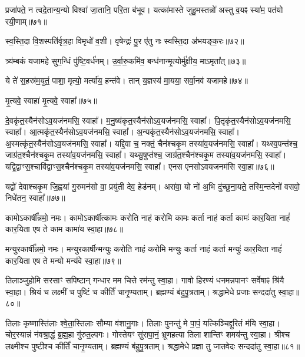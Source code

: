 प्रजा॑पते॒ न त्वदे॒तान्य॒न्यो विश्वा॑ जा॒तानि॒ परि॒ता ब॑भूव। 
यत्का॑मास्ते जुहु॒मस्तन्नो॑ अस्तु व॒यꣴ स्या॑म॒ पत॑यो रयी॒णाम्॥७१॥%
\anuvakamend 

स्व॒स्ति॒दा वि॒शस्पति॑र्वृत्र॒हा विमृधो॑ व॒शी। 
वृषेन्द्रः॑ पु॒र ए॑तु नः स्वस्ति॒दा अ॑भयङ्क॒रः॥७२॥
\anuvakamend 

त्र्य॑म्बकं यजामहे सुग॒न्धिं पु॑ष्टि॒वर्ध॑नम्। 
उ॒र्वा॒रु॒कमि॑व॒ बन्ध॑नान्मृ॒त्योर्मु॑क्षीय॒ माऽमृता᳚त्॥७३॥
\anuvakamend 

ये ते॑ स॒हस्र॑म॒युतं॒ पाशा॒ मृत्यो॒ मर्त्या॑य॒ हन्त॑वे। 
तान् य॒ज्ञस्य॑ मा॒यया॒ सर्वा॒नव॑ यजामहे॥७४॥\anuvakamend

मृ॒त्यवे॒ स्वाहा॑ मृ॒त्यवे॒ स्वाहा᳚॥७५॥%
\anuvakamend 

दे॒वकृ॑त॒स्यैन॑सोऽव॒\-यज॑न\-मसि॒ स्वाहा᳚। 
म॒नु॒ष्य॑कृत॒स्यैन॑सो\-ऽव॒\-यज॑न\-मसि॒ स्वाहा᳚। 
पि॒तृकृ॑त॒स्यैन॑सो\-ऽव॒\-यज॑न\-मसि॒ स्वाहा᳚। 
आ॒त्मकृ॑त॒स्यैन॑सो\-ऽव॒\-यज॑न\-मसि॒ स्वाहा᳚। 
अ॒न्यकृ॑त॒स्यैन॑सो\-ऽव॒\-यज॑न\-मसि॒ स्वाहा᳚। 
अ॒स्मत्कृ॑त॒स्यैन॑सो\-ऽव॒\-यज॑न\-मसि॒ स्वाहा᳚। 
यद्दि॒वा च॒ नक्तं॒ चैन॑श्चकृ॒म तस्या॑व॒यज॑नमसि॒ स्वाहा᳚। 
यथ्स्व॒पन्त॑श्च॒ जाग्र॑त॒श्चैन॑श्चकृ॒म तस्या॑व॒यज॑नमसि॒ स्वाहा᳚। 
यथ्सु॒षुप्त॑श्च॒ जाग्र॑त॒श्चैन॑श्चकृ॒म तस्या॑व॒यज॑नमसि॒ स्वाहा᳚। 
यद्वि॒द्वाꣳस॒\-श्चा\-वि॑द्वाꣳस॒श्चैन॑श्चकृ॒म तस्या॑व॒यज॑नमसि॒ स्वाहा᳚। 
एनस एनसोऽवयजनम॑सि स्वा॒हा॥७६॥\anuvakamend

यद्वो॑ देवाश्चकृ॒म जि॒ह्वया॑ गु॒रुमन॑सो वा॒ प्रयु॑ती देव॒ हेड॑नम्। 
अरा॑वा॒ यो नो॑ अ॒भि दु॑च्छुना॒यते॒ तस्मि॒न्तदेनो॑ वसवो॒ निधे॑तन॒ स्वाहा᳚॥७७॥ 
\anuvakamend



कामोऽकार्\mbox{}षी᳚न्नमो॒ नमः। 
कामोऽकार्\mbox{}षीत्कामः करोति नाहं करोमि कामः कर्ता नाहं कर्ता कामः॑ कार॒यिता नाहं॑ कार॒यिता एष ते काम कामा॑य स्वा॒हा॥७८॥
\anuvakamend

मन्युरकार्\mbox{}षी᳚न्नमो॒ नमः। 
मन्युरकार्\mbox{}षीन्मन्युः करोति नाहं करोमि मन्युः कर्ता नाहं कर्ता मन्युः॑ कार॒यिता नाहं॑ कार॒यिता एष ते मन्यो मन्य॑वे स्वा॒हा॥७९॥
\anuvakamend

तिलाञ्जुहोमि सरसाꣳ सपिष्टान् गन्धार मम चित्ते रम॑न्तु स्वा॒हा। 
गावो हिरण्यं धनमन्नपानꣳ सर्वेषाꣴ श्रि॑यै स्वा॒हा। 
श्रियं च लक्ष्मीं च पुष्टिं च कीर्तिं॑ चानृ॒ण्यताम्। 
ब्रह्मण्यं ब॑हुपु॒त्रताम्। 
श्रद्धामेधे प्रजाः सन्ददा॑तु स्वा॒हा॥८०॥
\anuvakamend

तिलाः कृष्णास्ति॑लाः श्वे॒ता॒स्तिलाः सौम्या व॑शानु॒गाः। 
तिलाः पुनन्तु॑ मे पा॒पं॒ यत्किञ्चिद्दुरितं म॑यि स्वा॒हा। 
चोर॒स्यान्नं न॑वश्रा॒द्धं॒ ब्र॒ह्म॒हा गु॑रुत॒ल्पगः। 
गोस्तेयꣳ सु॑रापा॒नं॒ भ्रूणहत्या तिला शान्तिꣳ शमय॑न्तु स्वा॒हा। 
श्रीश्च लक्ष्मीश्च पुष्टीश्च कीर्तिं॑ चानृ॒ण्यताम्। 
ब्रह्मण्यं ब॑हुपु॒त्रताम्। 
श्रद्धामेधे प्रज्ञा तु जातवेदः सन्ददा॑तु स्वा॒हा॥८१॥
\anuvakamend

